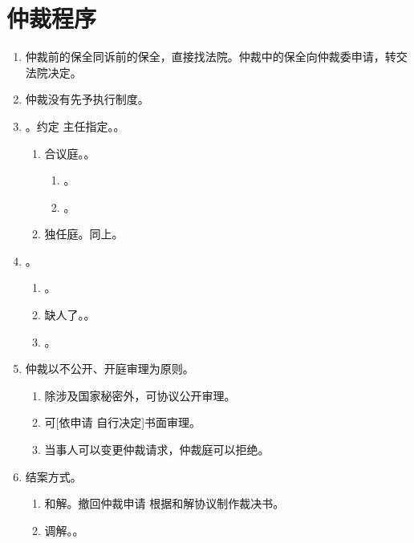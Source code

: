 \section{仲裁程序}
\begin{enumerate}
  \item 仲裁前的保全同诉前的保全，直接找法院。仲裁中的保全向仲裁委申请，转交法院决定。
  \item 仲裁没有先予执行制度。
  \item {}。约定 \dy 主任指定。。
        \begin{enumerate}
          \item 合议庭。。
                \begin{enumerate}
                  \item {}。
                  \item {}。
                \end{enumerate}
          \item 独任庭。同上。
        \end{enumerate}
  \item {}。
        \begin{enumerate}
          \item {}。
          \item 缺人了。。
          \item {}。
        \end{enumerate}
  \item 仲裁以不公开、开庭审理为原则。
        \begin{enumerate}
          \item 除涉及国家秘密外，可协议公开审理。
          \item 可[依申请 \hz 自行决定]书面审理。
          \item 当事人可以变更仲裁请求，仲裁庭可以拒绝。
        \end{enumerate}
  \item 结案方式。
        \begin{enumerate}
          \item 和解。撤回仲裁申请 \hz 根据和解协议制作裁决书。
          \item 调解。。

\end{enumerate}
\end{enumerate}
